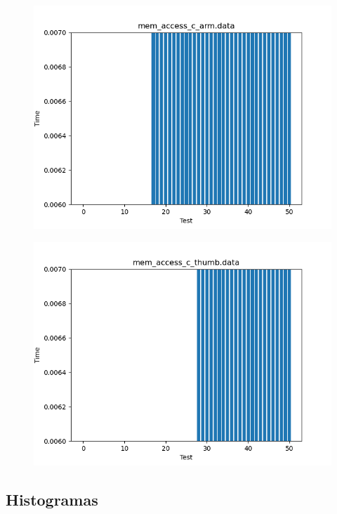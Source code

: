 \documentclass[a4paper,10pt]{article}
\begin{document}
\begin{figure}[H]
 \includegraphics[width=\linewidth]{data/mem_access_c_arm_sorted.png}
\end{figure}

\begin{figure}[H]
 \includegraphics[width=\linewidth]{data/mem_access_c_thumb_sorted.png}
\end{figure}

\subsection*{Histogramas}
\end{document}
